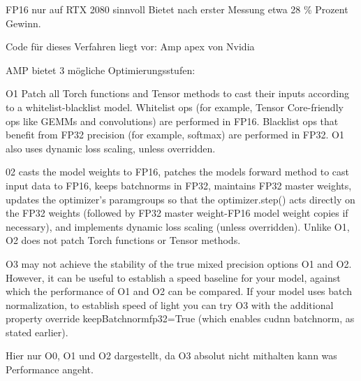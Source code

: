 FP16 nur auf RTX 2080 sinnvoll
Bietet nach erster Messung etwa 28 \% Prozent Gewinn.

Code für dieses Verfahren liegt vor: Amp apex von Nvidia

AMP bietet 3 mögliche Optimierungsstufen:

O1
Patch all Torch functions and Tensor methods to cast their inputs according to a whitelist-blacklist model. Whitelist ops (for example, Tensor Core-friendly ops like GEMMs and convolutions) are performed in FP16. Blacklist ops that benefit from FP32 precision (for example, softmax) are performed in FP32. O1 also uses dynamic loss scaling, unless overridden.

02
casts the model weights to FP16, patches the models forward method to cast input data to FP16, keeps batchnorms in FP32, maintains FP32 master weights, updates the optimizer’s paramgroups so that the optimizer.step() acts directly on the FP32 weights (followed by FP32 master weight-FP16 model weight copies if necessary), and implements dynamic loss scaling (unless overridden). Unlike O1, O2 does not patch Torch functions or Tensor methods.


O3
may not achieve the stability of the true mixed precision options O1 and O2. However, it can be useful to establish a speed baseline for your model, against which the performance of O1 and O2 can be compared. If your model uses batch normalization, to establish speed of light you can try O3 with the additional property override keepBatchnormfp32=True (which enables cudnn batchnorm, as stated earlier).

Hier nur O0, O1 und O2 dargestellt, da O3 absolut nicht mithalten kann was Performance angeht.

